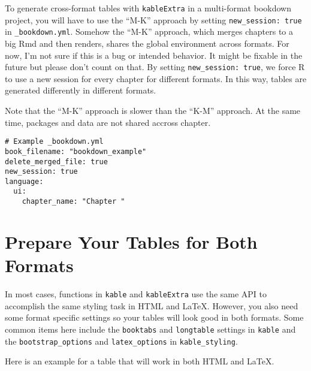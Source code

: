 \documentclass[]{book}
\newenvironment{Shaded}{\begin{snugshade}}{\end{snugshade}}
\newcommand{\DataTypeTok}[1]{\textcolor[rgb]{0.13,0.29,0.53}{#1}}
\newcommand{\DecValTok}[1]{\textcolor[rgb]{0.00,0.00,0.81}{#1}}
\newcommand{\KeywordTok}[1]{\textcolor[rgb]{0.13,0.29,0.53}{\textbf{#1}}}
\newcommand{\NormalTok}[1]{#1}
\newcommand{\OperatorTok}[1]{\textcolor[rgb]{0.81,0.36,0.00}{\textbf{#1}}}
\newcommand{\StringTok}[1]{\textcolor[rgb]{0.31,0.60,0.02}{#1}}
\begin{document}
To generate cross-format tables with \texttt{kableExtra} in a
multi-format bookdown project, you will have to use the ``M-K'' approach
by setting \texttt{new\_session:\ true} in \texttt{\_bookdown.yml}.
Somehow the ``M-K'' approach, which merges chapters to a big Rmd and
then renders, shares the global environment across formats. For now, I'm
not sure if this is a bug or intended behavior. It might be fixable in
the future but please don't count on that. By setting
\texttt{new\_session:\ true}, we force R to use a new session for every
chapter for different formats. In this way, tables are generated
differently in different formats.

Note that the ``M-K'' approach is slower than the ``K-M'' approach. At
the same time, packages and data are not shared accross chapter.

\begin{verbatim}
# Example _bookdown.yml
book_filename: "bookdown_example"
delete_merged_file: true
new_session: true
language:
  ui:
    chapter_name: "Chapter "
\end{verbatim}

\hypertarget{prepare-your-tables-for-both-formats}{%
\section{Prepare Your Tables for Both
Formats}\label{prepare-your-tables-for-both-formats}}

In most cases, functions in \texttt{kable} and \texttt{kableExtra} use
the same API to accomplish the same styling task in HTML and LaTeX.
However, you also need some format specific settings so your tables will
look good in both formats. Some common items here include the
\texttt{booktabs} and \texttt{longtable} settings in \texttt{kable} and
the \texttt{bootstrap\_options} and \texttt{latex\_options} in
\texttt{kable\_styling}.

Here is an example for a table that will work in both HTML and LaTeX.

\begin{Shaded}
\end{Shaded}
\end{document}
